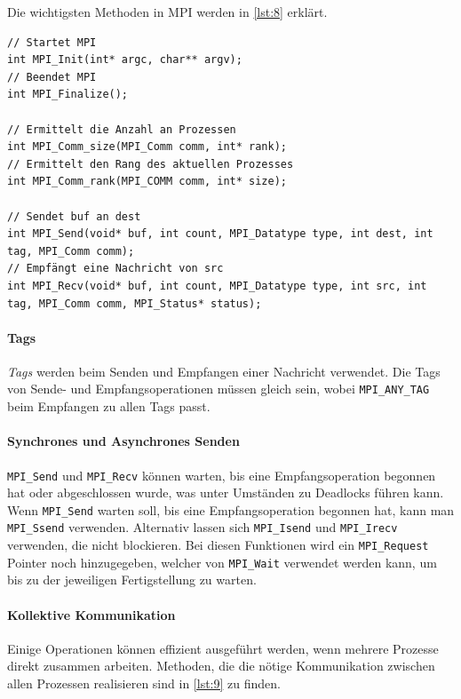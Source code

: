 Die wichtigsten Methoden in MPI werden in \autoref{lst:8} erklärt.

\begin{lstlisting}[label={lst:8}, caption={Grundlegende Funktionen in MPI.}]
// Startet MPI
int MPI_Init(int* argc, char** argv);
// Beendet MPI
int MPI_Finalize();

// Ermittelt die Anzahl an Prozessen
int MPI_Comm_size(MPI_Comm comm, int* rank);
// Ermittelt den Rang des aktuellen Prozesses
int MPI_Comm_rank(MPI_COMM comm, int* size);

// Sendet buf an dest
int MPI_Send(void* buf, int count, MPI_Datatype type, int dest, int tag, MPI_Comm comm);
// Empfängt eine Nachricht von src
int MPI_Recv(void* buf, int count, MPI_Datatype type, int src, int tag, MPI_Comm comm, MPI_Status* status);
\end{lstlisting}

\paragraph{Tags}
\emph{Tags} werden beim Senden und Empfangen einer Nachricht verwendet.
Die Tags von Sende- und Empfangsoperationen müssen gleich sein, wobei \lstinline|MPI_ANY_TAG| beim Empfangen zu allen Tags passt.

\paragraph{Synchrones und Asynchrones Senden}
\lstinline|MPI_Send| und \lstinline|MPI_Recv| können warten, bis eine Empfangsoperation begonnen hat oder abgeschlossen wurde, was unter Umständen zu Deadlocks führen kann.
Wenn \lstinline|MPI_Send| warten soll, bis eine Empfangsoperation begonnen hat, kann man \lstinline|MPI_Ssend| verwenden.
Alternativ lassen sich \lstinline|MPI_Isend| und \lstinline|MPI_Irecv| verwenden, die nicht blockieren.
Bei diesen Funktionen wird ein \lstinline|MPI_Request| Pointer noch hinzugegeben, welcher von \lstinline|MPI_Wait| verwendet werden kann, um bis zu der jeweiligen Fertigstellung zu warten.

\paragraph{Kollektive Kommunikation}
Einige Operationen können effizient ausgeführt werden, wenn mehrere Prozesse direkt zusammen arbeiten.
Methoden, die die nötige Kommunikation zwischen allen Prozessen realisieren sind in \autoref{lst:9} zu finden.


